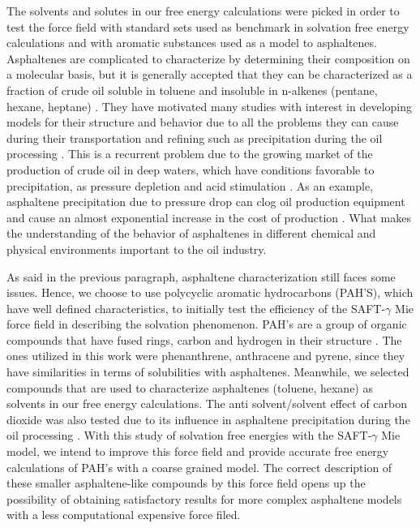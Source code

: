 The solvents and solutes in our free energy calculations were picked in order to test the force field with standard sets used as benchmark in solvation free energy calculations and with aromatic substances used as a model to asphaltenes. Asphaltenes are complicated to characterize by determining their composition on a molecular basis, but it is generally accepted that they can be characterized as a fraction of crude oil soluble in toluene and insoluble in n-alkenes (pentane, hexane, heptane) \cite{SJOBLOM2003399}. They have motivated many studies with interest in developing models for their structure and behavior due to all the problems they can cause during their transportation and refining such as precipitation  during the oil processing \cite{SJOBLOM20151}. This is a recurrent problem due to the growing market of the production of crude oil in deep waters, which have conditions favorable to precipitation, as pressure depletion and  acid stimulation \cite{AIC:AIC10243}. As an example, asphaltene precipitation due to pressure drop can clog oil production equipment and cause an almost exponential increase in the cost of production \cite{AIC:AIC10243,doi:10.1021/ef010047l}. What makes the understanding of the behavior of asphaltenes in different chemical and physical environments important to the oil industry. 

As said in the previous paragraph, asphaltene characterization still faces some issues. Hence, we choose to use polycyclic aromatic hydrocarbons (PAH'S), which have well defined characteristics, to initially test the efficiency of the SAFT-$\gamma$ Mie force field in describing the solvation phenomenon. PAH's are a group of organic compounds that have fused rings, carbon and hydrogen in their structure \cite{RAVINDRA20082895}. The ones utilized in this work were phenanthrene, anthracene and pyrene, since they have  similarities in terms of solubilities with asphaltenes. Meanwhile,  we selected compounds that are used to characterize asphaltenes (toluene, hexane) as solvents in our free energy calculations. The anti solvent/solvent effect of carbon dioxide was also tested due to its influence in asphaltene precipitation during the oil processing \cite{SOROUSH2014405}. With this study of solvation free energies with the SAFT-$\gamma$ Mie model, we intend to improve this force field and provide accurate free energy calculations of PAH's with a coarse grained model. The correct description of these smaller asphaltene-like compounds by this force field opens up the possibility of obtaining satisfactory results for more complex asphaltene models with a less computational expensive force filed.

 